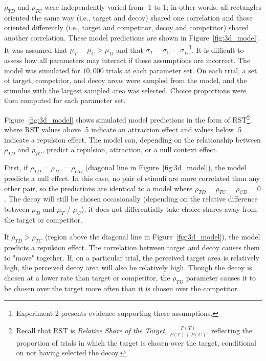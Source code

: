 $\rho_{TD}$ and $\rho_{TC}$ were independently varied from -1 to 1; in other words, all rectangles oriented the same way (i.e., target and decoy) shared one correlation and those oriented differently (i.e., target and competitor, decoy and competitor) shared another correlation. These model predictions are shown in Figure~\ref{fig:3d_model}. It was assumed that $\mu_{T}=\mu_{C}>\mu_{D}$ and that $\sigma_{T}=\sigma_{C}=\sigma_{D}$\footnote{Experiment 2 presents evidence supporting these assumptions.}. It is difficult to assess how all parameters may interact if these assumptions are incorrect. The model was simulated for $10,000$ trials at each parameter set. On each trial, a set of target, competitor, and decoy areas were sampled from the model, and the stimulus with the largest sampled area was selected. Choice proportions were then computed for each parameter set.

Figure~\ref{fig:3d_model} shows simulated model predictions in the form of RST\footnote{Recall that RST is \textit{Relative Share of the Target}, $\frac{P(T)}{P(T)+P(C)}$, reflecting the proportion of trials in which the target is chosen over the target, conditional on not having selected the decoy.}, where RST values above .5 indicate an attraction effect and values below .5 indicate a repulsion effect. The model can, depending on the relationship between $\rho_{TD}$ and $\rho_{TC}$, predict a repulsion, attraction, or a null context effect. 

First, if $\rho_{TD}=\rho_{TC}=\rho_{CD}$ (diagonal line in Figure~\ref{fig:3d_model}), the model predicts a null effect. In this case, no pair of stimuli are more correlated than any other pair, so the predictions are identical to a model where $\rho_{TD}=\rho_{TC}=\rho_{CD}=0$. The decoy will still be chosen occasionally (depending on the relative difference between $\mu_{D}$ and $\mu_{T}$ / $\mu_{C}$), it does not differentially take choice shares away from the target or competitor. 

If $\rho_{TD}>\rho_{TC}$ (region above the diagonal line in Figure~\ref{fig:3d_model}), the model predicts a repulsion effect. The correlation between target and decoy causes them to "move" together. If, on a particular trial, the perceived target area is relatively high, the perceived decoy area will also be relatively high. Though the decoy is chosen at a lower rate than target or competitor, the $\rho_{TD}$ parameter causes it to be chosen over the target more often than it is chosen over the competitor.  

